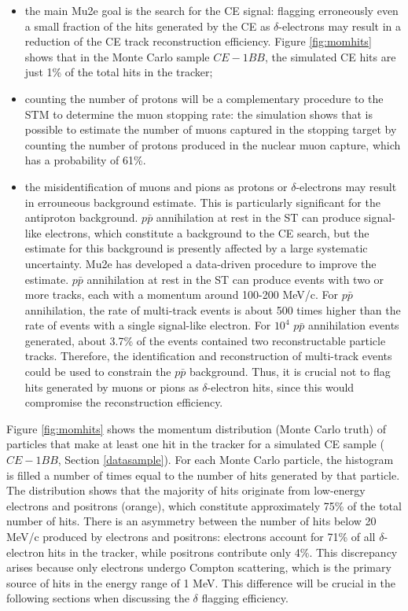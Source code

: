 \begin{itemize}
    \item the main Mu2e goal is the search for the 
    CE signal: flagging erroneously even a small 
    fraction of the hits generated by the 
    CE as $\delta$-electrons may result in a 
    reduction of the CE track reconstruction efficiency. 
    Figure \ref{fig:momhits} shows that in the 
    Monte Carlo sample $CE-1BB$, the simulated CE 
    hits are just 1\% of the total hits in the tracker;
    \item counting the number of protons 
    will be a complementary procedure to the 
    STM to determine the muon stopping rate: 
    the simulation shows that is possible to 
    estimate the number of muons captured in 
    the stopping target by counting the number 
    of protons produced in the nuclear muon 
    capture, which has a probability of 61\%.    
    \item the misidentification of muons 
    and pions as protons or $\delta$-electrons 
    may result in errouneous background estimate. 
    This is particularly significant for the 
    antiproton background.
    $p\bar{p}$ annihilation at rest in the ST 
    can produce signal-like electrons, which 
    constitute a background to the CE search, 
    but the estimate for this background is 
    presently affected by a large systematic 
    uncertainty. Mu2e has developed a data-driven 
    procedure to improve the estimate.
    $p\bar{p}$ annihilation at rest in the ST 
    can produce events with two or more tracks, 
    each with a momentum around 100-200 MeV/c. 
    For $p\bar{p}$ annihilation, 
    the rate of multi-track events 
    is about 500 times higher 
    than the rate of events with a single 
    signal-like electron. 
    For $10^4$ $p\bar{p}$ annihilation events 
    generated, about 3.7\% of 
    the events contained two reconstructable 
    particle tracks. Therefore, 
    the identification and reconstruction of 
    multi-track events could be 
    used to constrain the $p\bar{p}$ background. 
    Thus, it is crucial not to flag hits 
    generated by muons or pions as $\delta$-electron 
    hits, since this would compromise the 
    reconstruction efficiency. 
\end{itemize}
Figure \ref{fig:momhits} shows the 
momentum distribution (Monte Carlo truth) of 
particles that make at least one hit in the 
tracker for a simulated CE sample ($CE-1BB$, 
Section \ref{datasample}). 
For each Monte Carlo particle, the 
histogram is filled a number of times 
equal to the number of hits generated 
by that particle.
The distribution shows that the 
majority of hits originate from 
low-energy electrons and positrons 
(orange), which constitute approximately 
75\% of the total number of hits. 
There is an asymmetry between the 
number of hits below 20 MeV/c 
produced by electrons and positrons: 
electrons account for 
71\% of all $\delta$-electron hits in 
the tracker, while positrons 
contribute only 4\%. This discrepancy 
arises because only electrons 
undergo Compton scattering, which is 
the primary source of hits in the energy 
range of 1 MeV. This difference 
will be crucial in 
the following sections when discussing 
the $\delta$ flagging efficiency.

